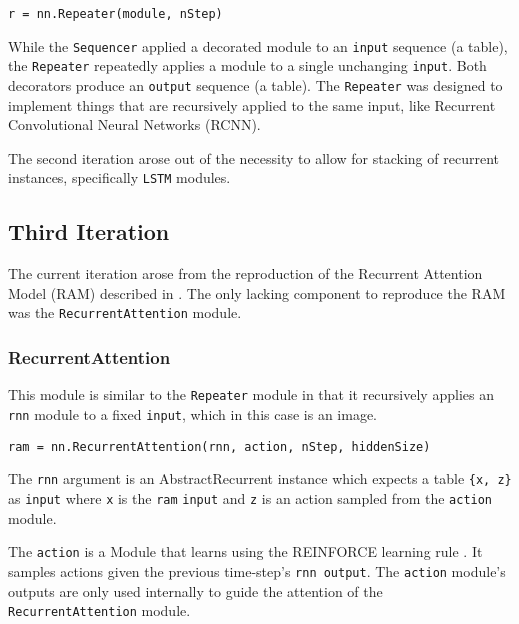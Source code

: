 \documentclass{article} %
\providecommand{\inlinecode}[1]{\texttt{#1}}
\begin{document}
\begin{verbatim}
r = nn.Repeater(module, nStep)
\end{verbatim}

While the \inlinecode{Sequencer} applied a decorated module to an \inlinecode{input} sequence (a table), 
the \inlinecode{Repeater} repeatedly applies a module to a single unchanging \inlinecode{input}. 
Both decorators produce an \inlinecode{output} sequence (a table). 
The \inlinecode{Repeater} was designed to implement things that are recursively applied to the same input,
like Recurrent Convolutional Neural Networks (RCNN)\cite{pinheiro2013recurrent}.

The second iteration arose out of the necessity to allow for stacking of recurrent instances, 
specifically \inlinecode{LSTM} modules. 

\subsection{Third Iteration}

The current iteration arose from the reproduction of the Recurrent Attention Model (RAM) 
described in \cite{mnih2014recurrent}.
The only lacking component to reproduce the RAM was the \inlinecode{RecurrentAttention}
module.

\subsubsection{RecurrentAttention}
This module is similar to the \inlinecode{Repeater} module in that it recursively applies 
an \inlinecode{rnn} module to a fixed \inlinecode{input}, which in this case is an image.

\begin{verbatim}
ram = nn.RecurrentAttention(rnn, action, nStep, hiddenSize)
\end{verbatim}

The \inlinecode{rnn} argument is an AbstractRecurrent instance
which expects a table \inlinecode{\{x, z\}} as \inlinecode{input} 
where \inlinecode{x} is the \inlinecode{ram} \inlinecode{input} and 
\inlinecode{z} is an action sampled from the \inlinecode{action} module. 

The \inlinecode{action} is a Module that learns using the 
REINFORCE learning rule \cite{williams1992simple}.
It samples actions given the previous time-step's \inlinecode{rnn output}. 
The \inlinecode{action} module's outputs are only used internally to guide 
the attention of the \inlinecode{RecurrentAttention} module.
\end{document}
